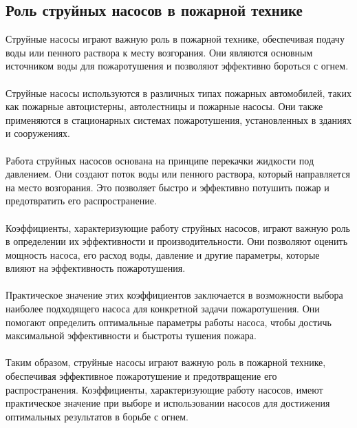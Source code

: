 \documentclass{article}
\begin{document}
\subsection{Роль струйных насосов в пожарной технике}
Струйные насосы играют важную роль в пожарной технике, обеспечивая подачу воды или пенного раствора к месту возгорания. Они являются основным источником воды для пожаротушения и позволяют эффективно бороться с огнем.\\
~\\
Струйные насосы используются в различных типах пожарных автомобилей, таких как пожарные автоцистерны, автолестницы и пожарные насосы. Они также применяются в стационарных системах пожаротушения, установленных в зданиях и сооружениях.\\
~\\
Работа струйных насосов основана на принципе перекачки жидкости под давлением. Они создают поток воды или пенного раствора, который направляется на место возгорания. Это позволяет быстро и эффективно потушить пожар и предотвратить его распространение.\\
~\\
Коэффициенты, характеризующие работу струйных насосов, играют важную роль в определении их эффективности и производительности. Они позволяют оценить мощность насоса, его расход воды, давление и другие параметры, которые влияют на эффективность пожаротушения.\\
~\\
Практическое значение этих коэффициентов заключается в возможности выбора наиболее подходящего насоса для конкретной задачи пожаротушения. Они помогают определить оптимальные параметры работы насоса, чтобы достичь максимальной эффективности и быстроты тушения пожара.\\
~\\
Таким образом, струйные насосы играют важную роль в пожарной технике, обеспечивая эффективное пожаротушение и предотвращение его распространения. Коэффициенты, характеризующие работу насосов, имеют практическое значение при выборе и использовании насосов для достижения оптимальных результатов в борьбе с огнем.
\end{document}
